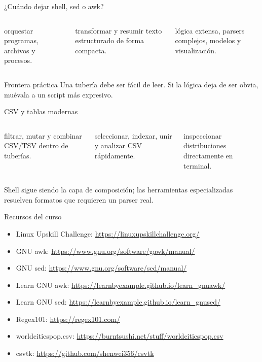 \documentclass[aspectratio=169,11pt]{beamer}
\begin{document}
\begin{frame}[fragile]{¿Cuándo dejar shell, sed o awk?}
  \begin{columns}[T,onlytextwidth]
      \par\smallskip
      \small orquestar programas, archivos y procesos.
      \par\smallskip
      \small transformar y resumir texto estructurado de forma compacta.
      \par\smallskip
      \small lógica extensa, parsers complejos, modelos y visualización.
  \end{columns}
  \vspace{8mm}
  \begin{wideblock}{Frontera práctica}
    Una tubería debe ser fácil de leer. Si la lógica deja de ser obvia, muévala a un script más expresivo.
  \end{wideblock}
\end{frame}

\begin{frame}[fragile]{CSV y tablas modernas}
  \begin{columns}[T,onlytextwidth]
      \par\smallskip
      \small filtrar, mutar y combinar CSV/TSV dentro de tuberías.
      \par\smallskip
      \small seleccionar, indexar, unir y analizar CSV rápidamente.
      \par\smallskip
      \small inspeccionar distribuciones directamente en terminal.
  \end{columns}
  \vspace{8mm}
  \centering\small Shell sigue siendo la capa de composición; las herramientas especializadas resuelven formatos que requieren un parser real.
\end{frame}

\begin{frame}[fragile]{Recursos del curso}
  \small
  \begin{itemize}
    \item Linux Upskill Challenge: \url{https://linuxupskillchallenge.org/}
    \item GNU awk: \url{https://www.gnu.org/software/gawk/manual/}
    \item GNU sed: \url{https://www.gnu.org/software/sed/manual/}
    \item Learn GNU awk: \url{https://learnbyexample.github.io/learn_gnuawk/}
    \item Learn GNU sed: \url{https://learnbyexample.github.io/learn_gnused/}
    \item Regex101: \url{https://regex101.com/}
    \item worldcitiespop.csv: \url{https://burntsushi.net/stuff/worldcitiespop.csv}
    \item csvtk: \url{https://github.com/shenwei356/csvtk}
  \end{itemize}
\end{frame}
\end{document}
